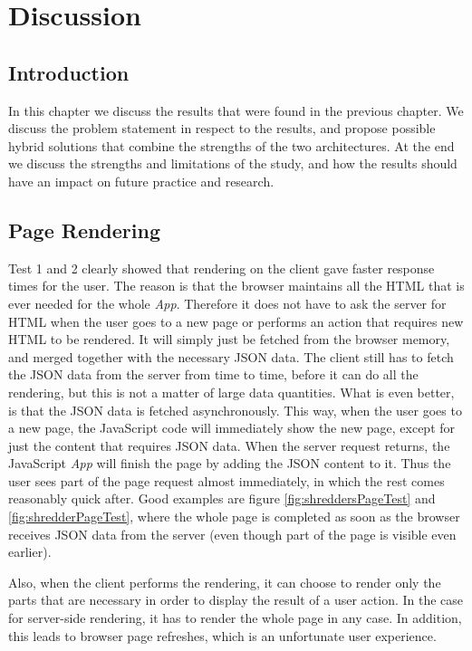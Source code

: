 
\chapter{Discussion}
\section{Introduction}
In this chapter we discuss the results that were found in the previous chapter. We discuss the problem statement in respect to the results, and propose possible hybrid solutions that combine the strengths of the two architectures. At the end we discuss the strengths and limitations of the study, and how the results should have an impact on future practice and research.

\section{Page Rendering}
Test 1 and 2 clearly showed that rendering on the client gave faster response times for the user. The reason is that the browser maintains all the HTML that is ever needed for the whole \textit{App}. Therefore it does not have to ask the server for HTML when the user goes to a new page or performs an action that requires new HTML to be rendered. It will simply just be fetched from the browser memory, and merged together with the necessary JSON data. The client still has to fetch the JSON data from the server from time to time, before it can do all the rendering, but this is not a matter of large data quantities. What is even better, is that the JSON data is fetched asynchronously. This way, when the user goes to a new page, the JavaScript code will immediately show the new page, except for just the content that requires JSON data. When the server request returns, the JavaScript \textit{App} will finish the page by adding the JSON content to it. Thus the user sees part of the page request almost immediately, in which the rest comes reasonably quick after. Good examples are figure \vref{fig:shreddersPageTest} and \vref{fig:shredderPageTest}, where the whole page is completed as soon as the browser receives JSON data from the server (even though part of the page is visible even earlier).

Also, when the client performs the rendering, it can choose to render only the parts that are necessary in order to display the result of a user action. In the case for server-side rendering, it has to render the whole page in any case. In addition, this leads to browser page refreshes, which is an unfortunate user experience. 

